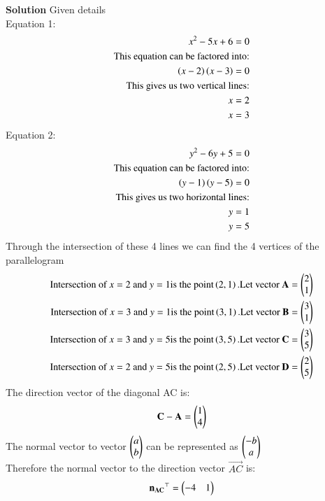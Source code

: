 \documentclass[journal]{IEEEtran}
\theoremstyle{remark}
\begin{document}
\textbf{Solution} Given details\\Equation 1:
\begin{align}
   x^2-5x+6=0\\
   \text{This equation can be factored into:}\\
   \left(x-2\right)\left(x-3\right)=0\\
   \text{This gives us two vertical lines:}\\
   x=2\\
   x=3
\end{align}
Equation 2:
\begin{align}
    y^2-6y+5=0\\
    \text{This equation can be factored into:}\\
    \left(y-1\right)\left(y-5\right)=0\\
    \text{This gives us two horizontal lines:}\\
    y=1\\
    y=5
\end{align}
Through the intersection of these 4 lines we can find the 4 vertices of the parallelogram 
\begin{align}
    \text{Intersection of}\  x=2\  \text{and}\  y=1 \text{is the point} \left(2,1\right).\text{Let vector}\ \mathbf{A}=\begin{pmatrix}2\\1\end{pmatrix}\\
    \text{Intersection of}\  x=3\  \text{and}\  y=1 \text{is the point} \left(3,1\right).\text{Let vector}\ \mathbf{B}=\begin{pmatrix}3\\1\end{pmatrix}\\
    \text{Intersection of}\  x=3\  \text{and}\  y=5 \text{is the point} \left(3,5\right).\text{Let vector}\ \mathbf{C}=\begin{pmatrix}3\\5\end{pmatrix}\\
    \text{Intersection of}\  x=2\  \text{and}\  y=5 \text{is the point} \left(2,5\right).\text{Let vector}\ \mathbf{D}=\begin{pmatrix}2\\5\end{pmatrix}\\
\end{align}
The direction vector of the diagonal AC is:
\begin{align}
    \mathbf{C}-\mathbf{A}=\begin{pmatrix}1\\4\end{pmatrix}
\end{align}
The normal vector to vector $\begin{pmatrix}a\\b\end{pmatrix}$ can be represented as $\begin{pmatrix}-b\\a\end{pmatrix}$\\
Therefore the normal vector to the direction vector $\vec{AC}$ is:
\begin{align}
    \mathbf{n_{AC}}^{\top}=\begin{pmatrix}-4&1\end{pmatrix}
\end{align}
\end{document}

